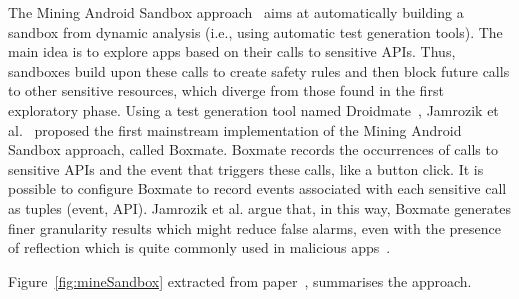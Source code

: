 


The Mining Android Sandbox approach~\cite{DBLP:conf/icse/JamrozikSZ16} aims at automatically
building a sandbox from dynamic analysis (i.e., using automatic test generation tools).
The main idea is to explore apps based on their calls to sensitive APIs.
Thus, sandboxes build upon these calls to create safety rules and then block future
calls to other sensitive resources, which diverge from those found in the first exploratory
phase. Using a test generation tool named Droidmate~\cite{DBLP:conf/icse/JamrozikZ16},
Jamrozik et al.~\cite{DBLP:conf/icse/JamrozikSZ16} proposed the first mainstream
implementation of the Mining Android Sandbox approach, called Boxmate. 
Boxmate records the occurrences of calls to sensitive APIs and the event that triggers these calls,
like a button click. It is possible to configure Boxmate to record events associated with each sensitive call as
tuples (event, API). Jamrozik et al. argue that, in this way, Boxmate generates finer granularity results which
might reduce false alarms, even with the presence of reflection which is quite commonly used in
malicious apps~\cite{DBLP:conf/issta/0029BOK16}. 

Figure~\ref{fig:mineSandbox} extracted from paper~\cite{DBLP:conf/wcre/BaoLL18}, summarises the approach. 

